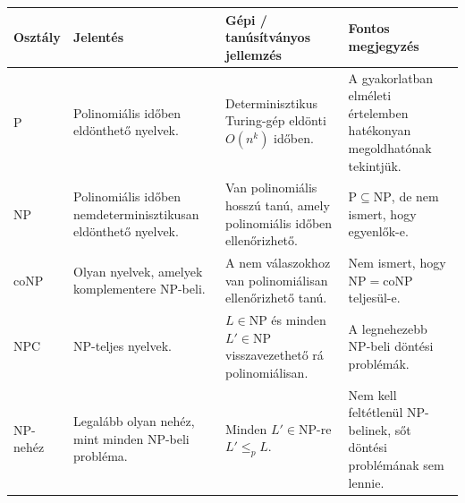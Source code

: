 \begin{tabularx}{\textwidth}{L{22mm}L{38mm}L{38mm}X}
\toprule
\textbf{Osztály} & \textbf{Jelentés} & \textbf{Gépi / tanúsítványos jellemzés} & \textbf{Fontos megjegyzés} \\
\midrule
$\mathrm{P}$ & Polinomiális időben eldönthető nyelvek. & Determinisztikus Turing-gép eldönti $O(n^k)$ időben. & A gyakorlatban elméleti értelemben hatékonyan megoldhatónak tekintjük. \\
$\mathrm{NP}$ & Polinomiális időben nemdeterminisztikusan eldönthető nyelvek. & Van polinomiális hosszú tanú, amely polinomiális időben ellenőrizhető. & $\mathrm{P}\subseteq\mathrm{NP}$, de nem ismert, hogy egyenlők-e. \\
$\mathrm{coNP}$ & Olyan nyelvek, amelyek komplementere $\mathrm{NP}$-beli. & A nem válaszokhoz van polinomiálisan ellenőrizhető tanú. & Nem ismert, hogy $\mathrm{NP}=\mathrm{coNP}$ teljesül-e. \\
$\mathrm{NPC}$ & NP-teljes nyelvek. & $L\in\mathrm{NP}$ és minden $L'\in\mathrm{NP}$ visszavezethető rá polinomiálisan. & A legnehezebb NP-beli döntési problémák. \\
$\mathrm{NP}$-nehéz & Legalább olyan nehéz, mint minden NP-beli probléma. & Minden $L'\in\mathrm{NP}$-re $L'\leq_p L$. & Nem kell feltétlenül $\mathrm{NP}$-belinek, sőt döntési problémának sem lennie. \\
\bottomrule
\end{tabularx}
